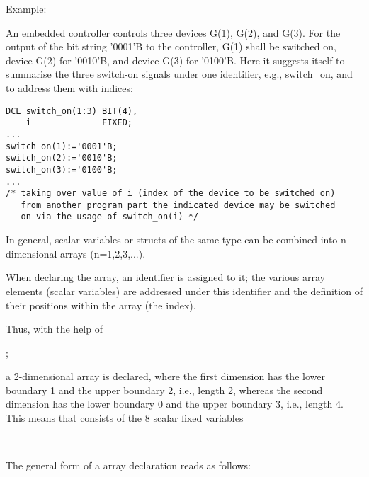 Example:

An embedded controller controls three devices G(1), G(2), and G(3). For
the output of the bit string '0001'B to the controller, G(1) shall be
switched on, device G(2) for '0010'B, and device G(3) for '0100'B. Here it
suggests itself to summarise the three switch-on signals under one
identifier, e.g., switch\_on, and to address them with indices:

\begin{lstlisting}
DCL switch_on(1:3) BIT(4),
    i              FIXED;
...
switch_on(1):='0001'B;
switch_on(2):='0010'B;
switch_on(3):='0100'B;
...
/* taking over value of i (index of the device to be switched on)
   from another program part the indicated device may be switched
   on via the usage of switch_on(i) */
\end{lstlisting}

In general, scalar variables
 or structs
of the same type can be combined into
n-dimensional arrays (n=1,2,3,...).

When declaring the array, an identifier is assigned to it; the various
array elements (scalar variables) are addressed under this identifier
and the definition of their positions within the array (the index).

Thus, with the help of

  ;

a 2-dimensional array is declared, where the first dimension has the
lower boundary 1 and the upper boundary 2, i.e., length 2, whereas the
second dimension has the lower boundary 0 and the upper boundary 3,
i.e., length 4.  This means that  consists of the 8 scalar fixed
variables

 \x {} \x 
     \x {} \\
 \x {} \x
     \x {}

The general form of a array declaration reads as follows:

\begin{grammarframe}
 




\end{grammarframe}

